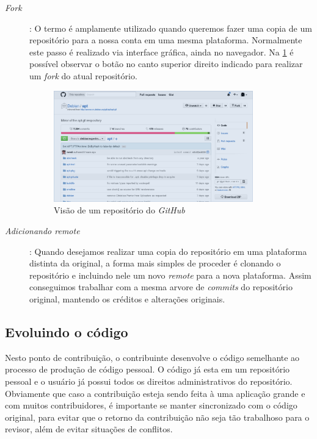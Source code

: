 \begin{description}
	\item [\textit{Fork}]: O termo é amplamente utilizado quando queremos fazer uma copia de um repositório para a nossa conta em uma mesma plataforma. Normalmente este passo é realizado via interface gráfica, ainda no navegador. Na \cref{fig:github_fork} é possível observar o botão no canto superior direito indicado para realizar um \textit{fork} do atual repositório.

	\begin{figure}[h]
	  \centering
		\includegraphics[width=0.85\textwidth]{figuras/fork}
	  \caption{Visão de um repositório do \textit{GitHub}}
	  \label{fig:github_fork}
	\end{figure}

	\item [\textit{Adicionando \textit{remote}}]: Quando desejamos realizar uma copia do repositório em uma plataforma distinta da original, a forma mais simples de proceder é clonando o repositório e incluindo nele um novo \textit{remote} para a nova plataforma. Assim conseguimos trabalhar com a mesma arvore de \textit{commits} do repositório original, mantendo os créditos e alterações originais.
\end{description}

\subsection*{Evoluindo o código} %
\label{sub:evoluindo_o_c_digo}

Nesto ponto de contribuição, o contribuinte desenvolve o código semelhante ao processo de produção de código pessoal. O código já esta em um repositório pessoal e o usuário já possui todos os direitos administrativos do repositório. Obviamente que caso a contribuição esteja sendo feita à uma aplicação grande e com muitos contribuidores, é importante se manter sincronizado com o código original, para evitar que o retorno da contribuição não seja tão trabalhoso para o revisor, além de evitar situações de conflitos.

